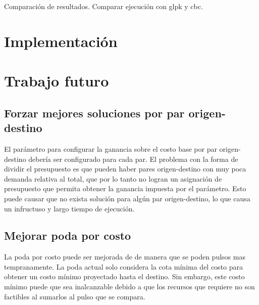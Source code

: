 \documentclass{article}
\begin{document}
  Comparación de resultados.
  Comparar ejecución con glpk y cbc.

  \section*{Implementación}

  \section*{Trabajo futuro}

  \subsection*{Forzar mejores soluciones por par origen-destino}

  El parámetro para configurar la ganancia sobre el costo base por par origen-destino debería ser configurado para cada par. El problema con la forma de dividir el presupuesto es que pueden haber pares origen-destino con muy poca demanda relativa al total, que por lo tanto no logran un asignación de presupuesto que permita obtener la ganancia impuesta por el parámetro. Esto puede causar que no exista solución para algún par origen-destino, lo que causa un infructuso y largo tiempo de ejecución.

  \subsection*{Mejorar poda por costo}

  La poda por costo puede ser mejorada de de manera que se poden pulsos mas tempranamente. La poda actual solo considera la cota mínima del costo para obtener un costo mínimo proyectado hasta el destino. Sin embargo, este costo mínimo puede que sea inalcanzable debido a que los recursos que requiere no son factibles al sumarlos al pulso que se compara.
\end{document}
